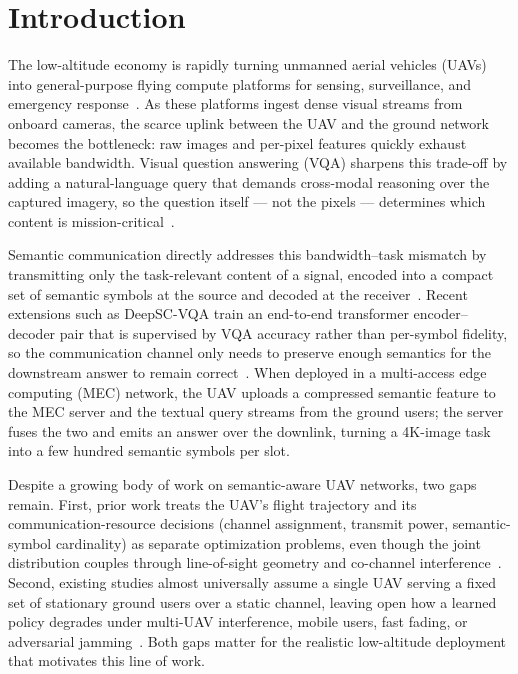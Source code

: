 \section{Introduction}\label{sec:intro}

The low-altitude economy is rapidly turning unmanned aerial vehicles (UAVs)
into general-purpose flying compute platforms for sensing, surveillance,
and emergency response~\cite{wang2025lowalt,kaleem2024emerging}. As these
platforms ingest dense visual streams from onboard cameras, the scarce
uplink between the UAV and the ground network becomes the bottleneck: raw
images and per-pixel features quickly exhaust available bandwidth. Visual
question answering (VQA) sharpens this trade-off by adding a natural-language
query that demands cross-modal reasoning over the captured imagery, so the
question itself --- not the pixels --- determines which content is
mission-critical~\cite{antol2015vqa,goyal2017vqav2}.

Semantic communication directly addresses this bandwidth--task mismatch by
transmitting only the task-relevant content of a signal, encoded into a
compact set of semantic symbols at the source and decoded at the
receiver~\cite{qin2024semanticnet,qin2024aiempowered}. Recent extensions
such as DeepSC-VQA train an end-to-end transformer encoder--decoder pair
that is supervised by VQA accuracy rather than per-symbol fidelity, so the
communication channel only needs to preserve enough semantics for the
downstream answer to remain
correct~\cite{xie2022taskoriented,xie2021deepsc}. When deployed in a
multi-access edge computing (MEC) network, the UAV uploads a compressed
semantic feature to the MEC server and the textual query streams from the
ground users; the server fuses the two and emits an answer over the
downlink, turning a 4K-image task into a few hundred semantic symbols per
slot.

Despite a growing body of work on semantic-aware UAV networks, two gaps
remain. First, prior work treats the UAV's flight trajectory and its
communication-resource decisions (channel assignment, transmit power,
semantic-symbol cardinality) as separate optimization problems, even though
the joint distribution couples through line-of-sight geometry and
co-channel interference~\cite{zhang2023drlsemantic,hu2025ratesplitting}.
Second, existing studies almost universally assume a single UAV serving a
fixed set of stationary ground users over a static channel, leaving open
how a learned policy degrades under multi-UAV interference, mobile users,
fast fading, or adversarial jamming~\cite{liu2024jamminguav}. Both gaps
matter for the realistic low-altitude deployment that motivates this line
of work.

